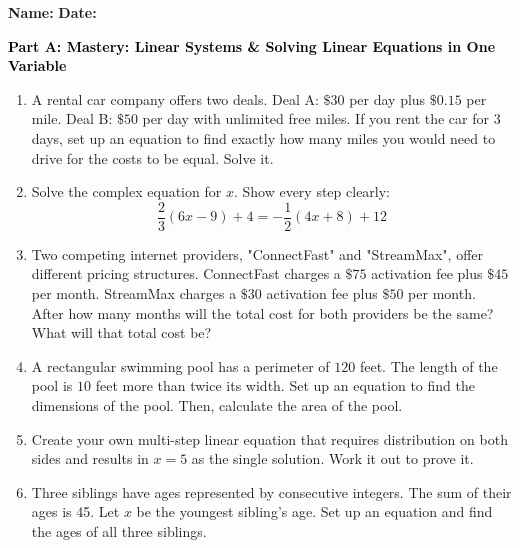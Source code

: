 \documentclass[12pt, letterpaper, fleqn]{article}
\begin{document}
\textbf{Name:} \underline{\hspace{5cm}}
\hfill
\textbf{Date:} \underline{\hspace{3cm}}\\

\begin{tcolorbox}[colback=customteal!20]
\large\textcolor{black}{\textbf{Part A: Mastery: Linear Systems & Solving Linear Equations in One Variable}}
\end{tcolorbox}

\vspace{3mm}

\begin{enumerate}[itemsep=5.5cm, leftmargin=0.6cm]
\item A rental car company offers two deals. Deal A: $\$30$ per day plus $\$0.15$ per mile. Deal B: $\$50$ per day with unlimited free miles. If you rent the car for 3 days, set up an equation to find exactly how many miles you would need to drive for the costs to be equal. Solve it.
\vspace{3cm}
\item Solve the complex equation for $x$. Show every step clearly: 
$$ \frac{2}{3}(6x - 9) + 4 = -\frac{1}{2}(4x + 8) + 12 $$
\vspace{3cm}
\item Two competing internet providers, "ConnectFast" and "StreamMax", offer different pricing structures. ConnectFast charges a $\$75$ activation fee plus $\$45$ per month. StreamMax charges a $\$30$ activation fee plus $\$50$ per month. After how many months will the total cost for both providers be the same? What will that total cost be?
\vspace{3cm}
\item A rectangular swimming pool has a perimeter of $120$ feet. The length of the pool is $10$ feet more than twice its width. Set up an equation to find the dimensions of the pool. Then, calculate the area of the pool.
\vspace{3cm}
\item Create your own multi-step linear equation that requires distribution on both sides and results in $x = 5$ as the single solution. Work it out to prove it.
\vspace{4cm}
\item Three siblings have ages represented by consecutive integers. The sum of their ages is 45. Let $x$ be the youngest sibling's age. Set up an equation and find the ages of all three siblings.
\vspace{3cm}
\end{enumerate}
\end{document}

